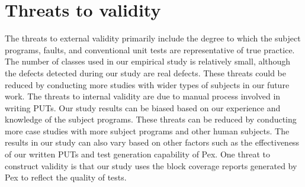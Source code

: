 \section{Threats to validity}
\label{sec:tov}
\vspace*{2ex}

The threats to external validity primarily include the degree to which the subject programs, faults, and conventional unit tests are representative of true practice. 
The number of classes used in our empirical study is relatively small, although the defects detected during our study are real defects. These threats could be reduced by conducting more studies with wider types of subjects in our future work. The threats to internal validity are due to manual process involved in writing PUTs. Our study results can be biased based on our experience and knowledge of the subject programs. These threats can be reduced by conducting more case studies with more subject programs and other human subjects. The results in our study can also vary based on other factors such as the effectiveness of our written PUTs and test generation capability of Pex. One threat to construct validity is that our study uses the block coverage reports generated by Pex to reflect the quality of tests.